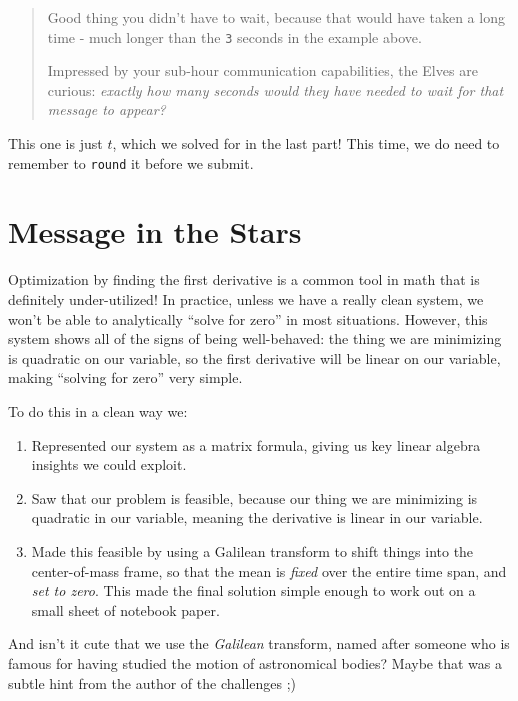 \documentclass[]{article}
\begin{document}
\begin{quote}
Good thing you didn't have to wait, because that would have taken a long time -
much longer than the \texttt{3} seconds in the example above.

Impressed by your sub-hour communication capabilities, the Elves are curious:
\emph{exactly how many seconds would they have needed to wait for that message
to appear?}
\end{quote}

This one is just \(t\), which we solved for in the last part! This time, we do
need to remember to \texttt{round} it before we submit.

\section{Message in the Stars}\label{message-in-the-stars}

Optimization by finding the first derivative is a common tool in math that is
definitely under-utilized! In practice, unless we have a really clean system, we
won't be able to analytically ``solve for zero'' in most situations. However,
this system shows all of the signs of being well-behaved: the thing we are
minimizing is quadratic on our variable, so the first derivative will be linear
on our variable, making ``solving for zero'' very simple.

To do this in a clean way we:

\begin{enumerate}
\def\labelenumi{\arabic{enumi}.}
\tightlist
\item
  Represented our system as a matrix formula, giving us key linear algebra
  insights we could exploit.
\item
  Saw that our problem is feasible, because our thing we are minimizing is
  quadratic in our variable, meaning the derivative is linear in our variable.
\item
  Made this feasible by using a Galilean transform to shift things into the
  center-of-mass frame, so that the mean is \emph{fixed} over the entire time
  span, and \emph{set to zero}. This made the final solution simple enough to
  work out on a small sheet of notebook paper.
\end{enumerate}

And isn't it cute that we use the \emph{Galilean} transform, named after someone
who is famous for having studied the motion of astronomical bodies? Maybe that
was a subtle hint from the author of the challenges ;)
\end{document}
